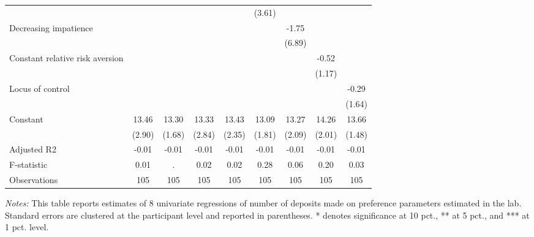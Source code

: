 \begin{table}[htbp]
{\begin{threeparttable}
\begin{tabular}{l*{8}{c}}
                &                  &                  &                  &                  &   (3.61)         &                  &                  &                  \\
Decreasing impatience&                  &                  &                  &                  &                  &    -1.75         &                  &                  \\
                &                  &                  &                  &                  &                  &   (6.89)         &                  &                  \\
Constant relative risk aversion&                  &                  &                  &                  &                  &                  &    -0.52         &                  \\
                &                  &                  &                  &                  &                  &                  &   (1.17)         &                  \\
Locus of control&                  &                  &                  &                  &                  &                  &                  &    -0.29         \\
                &                  &                  &                  &                  &                  &                  &                  &   (1.64)         \\
Constant        &    13.46\sym{***}&    13.30\sym{***}&    13.33\sym{***}&    13.43\sym{***}&    13.09\sym{***}&    13.27\sym{***}&    14.26\sym{***}&    13.66\sym{***}\\
                &   (2.90)         &   (1.68)         &   (2.84)         &   (2.35)         &   (1.81)         &   (2.09)         &   (2.01)         &   (1.48)         \\
\midrule
Adjusted R2     &    -0.01         &    -0.01         &    -0.01         &    -0.01         &    -0.01         &    -0.01         &    -0.01         &    -0.01         \\
F-statistic     &     0.01         &        .         &     0.02         &     0.02         &     0.28         &     0.06         &     0.20         &     0.03         \\
Observations    &      105         &      105         &      105         &      105         &      105         &      105         &      105         &      105         \\
\bottomrule \end{tabular} \begin{tablenotes}[flushleft] \footnotesize \item \emph{Notes:} This table reports estimates of 8 univariate regressions of number of deposits made on preference parameters estimated in the lab. Standard errors are clustered at the participant level and reported in parentheses. * denotes significance at 10 pct., ** at 5 pct., and *** at 1 pct. level. \end{tablenotes} \end{threeparttable} } \end{table}
